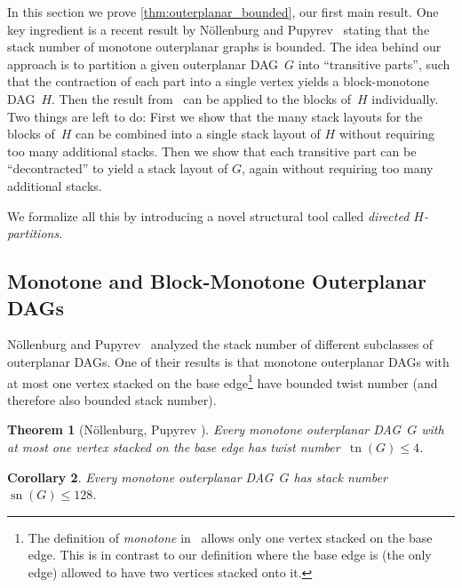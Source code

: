 \documentclass{article}
\newtheorem{theorem}{Theorem}\newtheorem{lemma}[theorem]{Lemma}\newtheorem{proposition}[theorem]{Proposition}\newtheorem{corollary}[theorem]{Corollary}\newtheorem{definition}[theorem]{Definition}\newtheorem{claim}[theorem]{Claim}\newtheorem{remark}[theorem]{Remark}\newtheorem{observation}[theorem]{Observation}\newtheorem{conjecture}[theorem]{Conjecture}\newtheorem{example}[theorem]{Example}
\DeclareMathOperator{\sn}{sn}
\DeclareMathOperator{\tn}{tn}
\newcommand{\Hpartition}{$H$\nobreakdash-partition\xspace}
\begin{document}
In this section we prove \cref{thm:outerplanar_bounded}, our first main result.
One key ingredient is a recent result by N\"{o}llenburg and Pupyrev~\cite{Noellenburg2021_DAGsWithConstantStackNumber} stating that the stack number of monotone outerplanar graphs is bounded.
The idea behind our approach is to partition a given outerplanar DAG~$G$ into \enquote{transitive parts}, such that the contraction of each part into a single vertex yields a block-monotone DAG~$H$.
Then the result from~\cite{Noellenburg2021_DAGsWithConstantStackNumber} can be applied to the blocks of~$H$ individually.
Two things are left to do:
First we show that the many stack layouts for the blocks of~$H$ can be combined into a single stack layout of $H$ without requiring too many additional stacks.
Then we show that each transitive part can be \enquote{decontracted} to yield a stack layout of $G$, again without requiring too many additional stacks.

We formalize all this by introducing a novel structural tool called \emph{directed \Hpartition{}s}.

\subsection{Monotone and Block-Monotone Outerplanar DAGs}

N\"{o}llenburg and Pupyrev~\cite{Noellenburg2021_DAGsWithConstantStackNumber} analyzed the stack number of different subclasses of outerplanar DAGs.
One of their results is that monotone outerplanar DAGs with at most one vertex stacked on the base edge\footnote{
    The definition of \emph{monotone} in~\cite{Noellenburg2021_DAGsWithConstantStackNumber} allows only one vertex stacked on the base edge.
    This is in contrast to our definition where the base edge is (the only edge) allowed to have two vertices stacked onto it.
} have bounded twist number (and therefore also bounded stack number).

\begin{theorem}[N\"{o}llenburg, Pupyrev \cite{Noellenburg2021_DAGsWithConstantStackNumber}]
    \label{thm:monotone_outerplanar_twist_4}
    Every monotone outerplanar DAG~$G$ with at most one vertex stacked on the base edge has twist number~$\tn(G) \leq 4$.
\end{theorem}

\begin{corollary}
    \label{cor:monotone_outerplanar_stack_128}
    Every monotone outerplanar DAG~$G$ has stack number~$\sn(G) \leq 128$.
\end{corollary}
\end{document}
